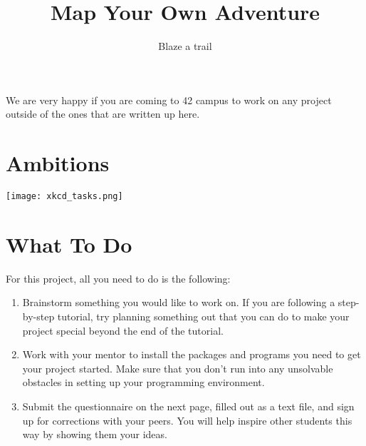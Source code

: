 \documentclass{42-en}
\begin{document}
\title{Map Your Own Adventure}
\subtitle{Blaze a trail}


\summary
{
We are very happy if you are coming to 42 campus to work on any project outside
of the ones that are written up here.
}

\maketitle

\tableofcontents


\startexercices


\chapter{Ambitions}

\begin{center}
\texttt{[image: xkcd\_tasks.png]}
\end{center}


\chapter{What To Do}

For this project, all you need to do is the following:

\begin{enumerate}

	\item Brainstorm something you would like to work on. If you are following a step-by-step tutorial, try planning something out that you can do to make your project special beyond the end of the tutorial.
	\item Work with your mentor to install the packages and programs you need to get your project started. Make sure that you don't run into any unsolvable obstacles in setting up your programming environment.
	\item Submit the questionnaire on the next page, filled out as a text file, and sign up for corrections with your peers. You will help inspire other students this way by showing them your ideas.

\end{enumerate}
\end{document}
